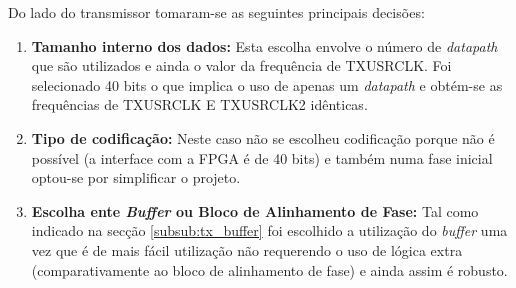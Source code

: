 Do lado do transmissor tomaram-se as seguintes principais decisões:
\begin{enumerate}
	\item \textbf{Tamanho interno dos dados:} Esta escolha envolve o número de \textit{datapath} que são utilizados e ainda o valor da frequência de TXUSRCLK. Foi selecionado 40 bits o que implica o uso de apenas um \textit{datapath} e obtém-se as frequências de TXUSRCLK E TXUSRCLK2 idênticas.
	\item \textbf{Tipo de codificação:} Neste caso não se escolheu codificação porque não é possível (a interface com a FPGA é de 40 bits) e também numa fase inicial optou-se por simplificar o projeto.
	\item \textbf{Escolha ente \textit{Buffer} ou Bloco de Alinhamento de Fase:} Tal como indicado na secção \ref{subsub:tx_buffer} foi escolhido a utilização do \textit{buffer} uma vez que é de mais fácil utilização não requerendo o uso de lógica extra (comparativamente ao bloco de alinhamento de fase) e ainda assim é robusto.
\end{enumerate}

